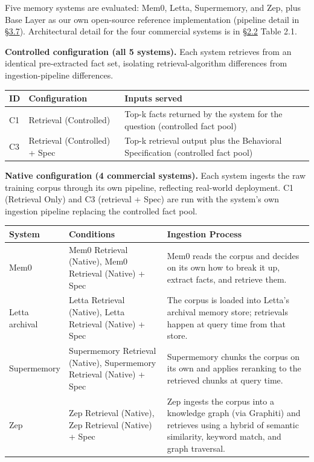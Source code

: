 Five memory systems are evaluated: Mem0, Letta, Supermemory, and Zep,
plus Base Layer as our own open-source reference implementation
(pipeline detail in \hyperref[pipeline-for-the-behavioral-specification]{§3.7}). Architectural detail for the four commercial
systems is in \hyperref[memory-systems-for-llm-agents]{§2.2} Table 2.1.

\textbf{Controlled configuration (all 5 systems).} Each system retrieves
from an identical pre-extracted fact set, isolating retrieval-algorithm
differences from ingestion-pipeline differences.

\begin{longtable}[]{@{}
  >{\raggedright\arraybackslash}p{}
  >{\raggedright\arraybackslash}p{}
  >{\raggedright\arraybackslash}p{}@{}}
\toprule
ID & Configuration & Inputs served \\
\midrule
\endhead
C1 & Retrieval (Controlled) & Top-k facts returned by the system for the
question (controlled fact pool) \\
C3 & Retrieval (Controlled) + Spec & Top-k retrieval output plus the
Behavioral Specification (controlled fact pool) \\
\bottomrule
\end{longtable}

\textbf{Native configuration (4 commercial systems).} Each system
ingests the raw training corpus through its own pipeline, reflecting
real-world deployment. C1 (Retrieval Only) and C3 (retrieval + Spec) are
run with the system's own ingestion pipeline replacing the controlled
fact pool.

\begin{longtable}[]{@{}
  >{\raggedright\arraybackslash}p{}
  >{\raggedright\arraybackslash}p{}
  >{\raggedright\arraybackslash}p{}@{}}
\toprule
System & Conditions & Ingestion Process \\
\midrule
\endhead
Mem0 & Mem0 Retrieval (Native), Mem0 Retrieval (Native) + Spec & Mem0
reads the corpus and decides on its own how to break it up, extract
facts, and retrieve them. \\
Letta archival & Letta Retrieval (Native), Letta Retrieval (Native) +
Spec & The corpus is loaded into Letta's archival memory store;
retrievals happen at query time from that store. \\
Supermemory & Supermemory Retrieval (Native), Supermemory Retrieval
(Native) + Spec & Supermemory chunks the corpus on its own and applies
reranking to the retrieved chunks at query time. \\
Zep & Zep Retrieval (Native), Zep Retrieval (Native) + Spec & Zep
ingests the corpus into a knowledge graph (via Graphiti) and retrieves
using a hybrid of semantic similarity, keyword match, and graph
traversal. \\
\bottomrule
\end{longtable}

